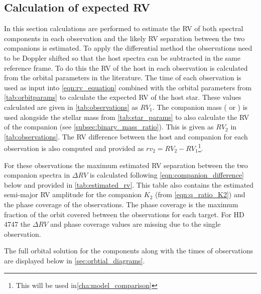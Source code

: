 
\subsection{Calculation of expected {RV}}
\label{subsec:expected_RV_calc}
In this section calculations are performed to estimate the {RV} of both spectral components in each observation and the likely {RV} separation between the two companions is estimated.
To apply the differential method the observations need to be Doppler shifted so that the host spectra can be subtracted in the same reference frame.
To do this the {RV} of the host in each observation is calculated from the orbital parameters in the literature.
The time of each observation is used as input into \cref{eqn:rv_equation} combined with the orbital parameters from \cref{tab:orbitparams} to calculate the expected {RV} of the host star.
These values calculated are given in \cref{tab:observations} as \({RV}_{1}\).
The companion mass (\Mtwo{} or \Mtwosini{}) is used alongside the stellar mass from \cref{tab:star_params} to also calculate the {RV} of the companion (see \cref{subsec:binary_mass_ratio}).
This is given as \({RV}_{2}\) in \cref{tab:observations}.
The {RV} difference between the host and companion for each observation is also computed and provided as \({rv}_{2} = {RV}_{2}-{RV}_{1}\)\footnote{This will be used in\cref{cha:model_comparison}}.

For these observations the maximum estimated {RV} separation between the two companion spectra in \(\Delta {RV}\) is calculated following \cref{eqn:companion_difference} below and provided in \cref{tab:estimated_rv}.
This table also contains the estimated semi-major {RV} amplitude for the companion \(K_2\) (from \cref{eqn:q_ratio_K2}) and the phase coverage of the observations.
The phase coverage is the maximum fraction of the orbit covered between the observations for each target.
For {HD\,4747} the \(\Delta {RV}\) and phase coverage values are missing due to the single observation.




The full orbital solution for the components along with the times of observations are displayed below in \cref{sec:orbtial_diagrams}.


